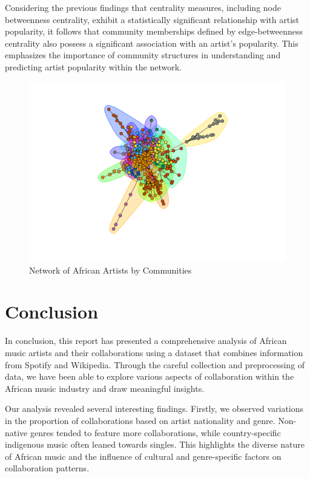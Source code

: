 \documentclass{article}
\begin{document}
Considering the previous findings that centrality measures, including node
betweenness centrality, exhibit a statistically significant relationship with
artist popularity, it follows that community memberships defined by
edge-betweenness centrality also possess a significant association with an
artist's popularity. This emphasizes the importance of community structures in
understanding and predicting artist popularity within the network.

\begin{figure}[H]
    \centering
    \includegraphics[width=\textwidth]{../data/figures/african_artist_network_communities.png}
    \caption{Network of African Artists by Communities}\label{fig:network_communities}
\end{figure}

\section{Conclusion}

In conclusion, this report has presented a comprehensive analysis of African
music artists and their collaborations using a dataset that combines
information from Spotify and Wikipedia. Through the careful collection and
preprocessing of data, we have been able to explore various aspects of
collaboration within the African music industry and draw meaningful insights.

Our analysis revealed several interesting findings. Firstly, we observed
variations in the proportion of collaborations based on artist nationality and
genre. Non-native genres tended to feature more collaborations, while
country-specific indigenous music often leaned towards singles. This highlights
the diverse nature of African music and the influence of cultural and
genre-specific factors on collaboration patterns.
\end{document}
